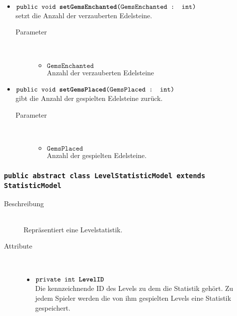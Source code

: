 \begin{description}
\begin{itemize}
					\item $\texttt{public  void \textbf{setGemsEnchanted}(GemsEnchanted : int)}$ \\ setzt die Anzahl der verzauberten Edelsteine.
				\begin{description}
				\item[Parameter] \hfill \\
					\vspace{-.8cm}
					\begin{itemize}
						\item $\texttt{GemsEnchanted }$ \\Anzahl der verzauberten Edelsteine
					\end{itemize}	
					\end{description}
					\item $\texttt{public  void \textbf{setGemsPlaced}(GemsPlaced : int)}$ \\ gibt die Anzahl der gespielten Edelsteine zurück.
				\begin{description}
				\item[Parameter] \hfill \\
					\vspace{-.8cm}
					\begin{itemize}
						\item $\texttt{GemsPlaced }$ \\ Anzahl der gespielten Edelsteine.
					\end{itemize}	
					\end{description}
			\end{itemize}
		\end{description}
\subsubsection{\normalfont \texttt{public abstract class \textbf{LevelStatisticModel} extends StatisticModel}} 
\begin{description}
		
		\item[Beschreibung] \hfill \\ Repräsentiert eine Levelstatistik.
		\item[Attribute] \hfill \\
			\vspace{-.8cm}
			\begin{itemize}
				\item $\texttt{private int \textbf{LevelID}}$ \\ Die kennzeichnende ID des Levels zu dem die Statistik gehört. Zu jedem Spieler werden die von ihm gespielten Levels eine Statistik gespeichert.				
			\end{itemize}
		\end{description}
				
			